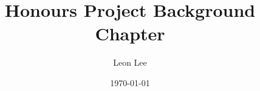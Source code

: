 \documentclass[logo,bsc,singlespacing,parskip,online]{infthesis}
\begin{document}
\begin{preliminary}


\title{Honours Project Background Chapter}

\author{Leon Lee}


\date{\today}

%


\end{preliminary}
\end{document}
